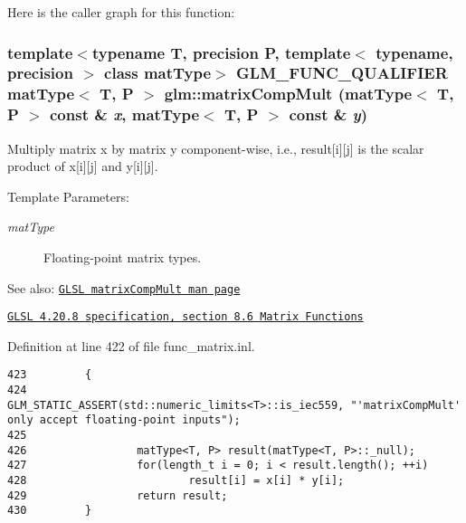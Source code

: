 Here is the caller graph for this function:\hypertarget{group__core__func__matrix_g30bbe46a821497b9ae0c63a2d27db0b2}{
\subsubsection[matrixCompMult]{\setlength{\rightskip}{0pt plus 5cm}template$<$typename T, precision P, template$<$ typename, precision $>$ class matType$>$ GLM\_\-FUNC\_\-QUALIFIER matType$<$ T, P $>$ glm::matrixCompMult (matType$<$ T, P $>$ const \& {\em x}, \/  matType$<$ T, P $>$ const \& {\em y})}}
\label{group__core__func__matrix_g30bbe46a821497b9ae0c63a2d27db0b2}


Multiply matrix x by matrix y component-wise, i.e., result\mbox{[}i\mbox{]}\mbox{[}j\mbox{]} is the scalar product of x\mbox{[}i\mbox{]}\mbox{[}j\mbox{]} and y\mbox{[}i\mbox{]}\mbox{[}j\mbox{]}.

\begin{Desc}
\item[Template Parameters:]
\begin{description}
\item[{\em matType}]Floating-point matrix types.\end{description}
\end{Desc}
\begin{Desc}
\item[See also:]\href{http://www.opengl.org/sdk/docs/manglsl/xhtml/matrixCompMult.xml}{\tt GLSL matrixCompMult man page} 

\href{http://www.opengl.org/registry/doc/GLSLangSpec.4.20.8.pdf}{\tt GLSL 4.20.8 specification, section 8.6 Matrix Functions} \end{Desc}


Definition at line 422 of file func\_\-matrix.inl.

\begin{Code}\begin{verbatim}423         {
424                 GLM_STATIC_ASSERT(std::numeric_limits<T>::is_iec559, "'matrixCompMult' only accept floating-point inputs");
425 
426                 matType<T, P> result(matType<T, P>::_null);
427                 for(length_t i = 0; i < result.length(); ++i)
428                         result[i] = x[i] * y[i];
429                 return result;
430         }
\end{verbatim}
\end{Code}


